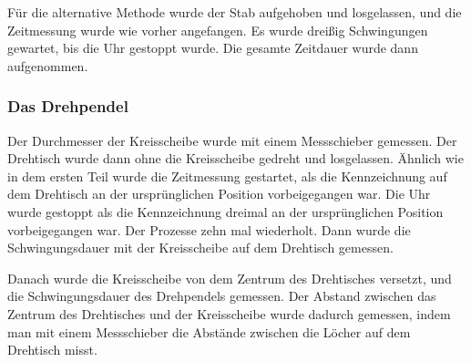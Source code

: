 \documentclass[11pt,a4paper]{article} %
\begin{document}
Für die alternative Methode wurde der Stab aufgehoben und losgelassen, und die Zeitmessung wurde wie vorher angefangen. Es wurde dreißig Schwingungen gewartet, bis die Uhr gestoppt wurde. Die gesamte Zeitdauer wurde dann aufgenommen. 


\subsubsection{Das Drehpendel}
Der Durchmesser der Kreisscheibe wurde mit einem Messschieber gemessen. Der Drehtisch wurde dann ohne die Kreisscheibe gedreht und losgelassen. Ähnlich wie in dem ersten Teil wurde die Zeitmessung gestartet, als die Kennzeichnung auf dem Drehtisch an der ursprünglichen Position vorbeigegangen war. Die Uhr wurde gestoppt als die Kennzeichnung dreimal an der ursprünglichen Position vorbeigegangen war. Der Prozesse zehn mal wiederholt. Dann wurde die Schwingungsdauer mit der Kreisscheibe auf dem Drehtisch gemessen. 

Danach wurde die Kreisscheibe von dem Zentrum des Drehtisches versetzt, und die Schwingungsdauer des Drehpendels gemessen. Der Abstand zwischen das Zentrum des Drehtisches und der Kreisscheibe wurde dadurch gemessen, indem man mit einem Messschieber die Abstände zwischen die Löcher auf dem Drehtisch misst.
\end{document}
